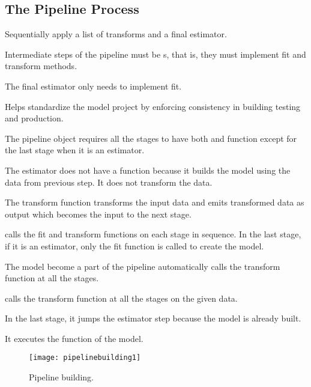 	\subsection{The Pipeline Process}
	\begin{numberedlist}
		\item Sequentially apply a list of transforms and a final estimator.
		\item Intermediate steps of the pipeline must be s, that is, they must implement fit and transform methods.
		\item The final estimator only needs to implement fit.
		\item Helps standardize the model project by enforcing consistency in building testing and production.
	\end{numberedlist}

	\begin{bulletedlist}
		\item The pipeline object requires all the stages to have both  and  function except for the last stage when it is an estimator.
		\item The estimator does not have a  function because it builds the model using the data from previous step. It does not transform the data.
		\item The transform function transforms the input data and emits transformed data as output which becomes the input to the next stage.
		\item {} calls the fit and transform functions on each stage in sequence. In the last stage, if it is an estimator, only the fit function is called to create the model.
		\item The model become a part of the pipeline automatically  calls the transform function at all the stages.
		\item {} calls the transform function at all the stages on the given data.
		\item In the last stage, it jumps the estimator step because the model is already built.
		\item It executes the  function of the model.
	\end{bulletedlist}

	\begin{figure}[tbh]
		\centering
		\texttt{[image: pipelinebuilding1]}
		\caption[Pipeline building]{Pipeline building.}
		\label{fig:pipelinebuilding1}
	\end{figure}

